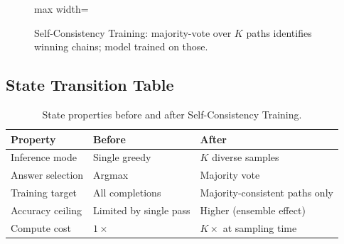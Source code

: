 \begin{figure}[h]
\centering
\begin{adjustbox}{max width=\linewidth}
\end{adjustbox}
\caption{Self-Consistency Training: majority-vote over $K$ paths identifies winning chains; model trained on those.}
\end{figure}

\subsection{State Transition Table}
\begin{table}[h]\centering
\begin{tabular}{lll}\toprule
\textbf{Property} & \textbf{Before} & \textbf{After}\\\midrule
Inference mode & Single greedy & $K$ diverse samples\\
Answer selection & Argmax & Majority vote\\
Training target & All completions & Majority-consistent paths only\\
Accuracy ceiling & Limited by single pass & Higher (ensemble effect)\\
Compute cost & $1\times$ & $K\times$ at sampling time\\\bottomrule
\end{tabular}
\caption{State properties before and after Self-Consistency Training.}
\end{table}

